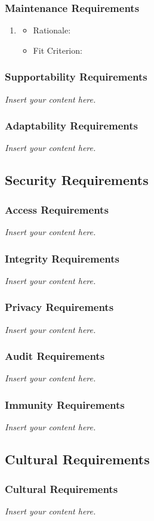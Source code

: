 \documentclass[12pt]{article}
\newcommand{\lips}{\textit{Insert your content here.}}
\begin{document}
\subsubsection{Maintenance Requirements}
\begin{enumerate}[{MSR}1.] 
  \item \label{MSR1} 
  \begin{itemize}
    \item Rationale:
    \item Fit Criterion:
  \end{itemize}
\end{enumerate}
\subsubsection{Supportability Requirements}
\lips
\subsubsection{Adaptability Requirements}
\lips

\subsection{Security Requirements}
\subsubsection{Access Requirements}
\lips
\subsubsection{Integrity Requirements}
\lips
\subsubsection{Privacy Requirements}
\lips
\subsubsection{Audit Requirements}
\lips
\subsubsection{Immunity Requirements}
\lips

\subsection{Cultural Requirements}
\subsubsection{Cultural Requirements}
\lips
\end{document}
